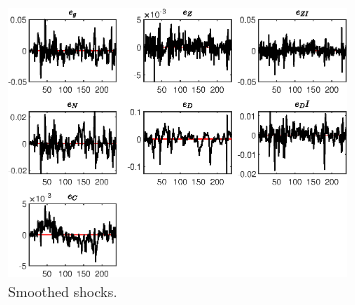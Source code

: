  
\begin{figure}[H]
\centering 
\includegraphics[width=0.80\textwidth]{BRS_pred_labor/graphs/BRS_pred_labor_SmoothedShocks1}
\caption{Smoothed shocks.}\label{Fig:SmoothedShocks:1}
\end{figure}


